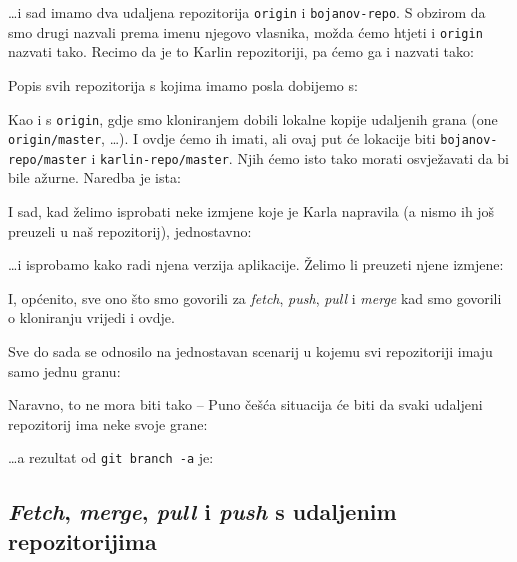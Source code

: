
\dots{}i sad imamo dva udaljena repozitorija \verb+origin+ i \verb+bojanov-repo+.
S obzirom da smo drugi nazvali prema imenu njegovo vlasnika, možda ćemo htjeti i \verb+origin+ nazvati tako.
Recimo da je to Karlin repozitoriji, pa ćemo ga i nazvati tako:


Popis svih repozitorija s kojima imamo posla dobijemo s:



Kao i s \verb+origin+, gdje smo kloniranjem dobili lokalne kopije udaljenih grana (one \verb+origin/master+, \dots). 
I ovdje ćemo ih imati, ali ovaj put će lokacije biti \verb+bojanov-repo/master+ i \verb+karlin-repo/master+.
Njih ćemo isto tako morati osvježavati da bi bile ažurne.
Naredba je ista:


I sad, kad želimo isprobati neke izmjene koje je Karla napravila (a nismo ih još preuzeli u naš repozitorij), jednostavno:


\dots{}i isprobamo kako radi njena verzija aplikacije. Želimo li preuzeti njene izmjene:


I, općenito, sve ono što smo govorili za \emph{fetch}, \emph{push}, \emph{pull} i \emph{merge} kad smo govorili o kloniranju vrijedi i ovdje.

Sve do sada se odnosilo na jednostavan scenarij u kojemu svi repozitoriji imaju samo jednu granu:



Naravno, to ne mora biti tako -- Puno češća situacija će biti da svaki udaljeni repozitorij ima neke svoje grane:



\dots{}a rezultat od \verb+git branch -a+ je:



\subsection*{\emph{Fetch}, \emph{merge}, \emph{pull} i \emph{push} s udaljenim repozitorijima}

